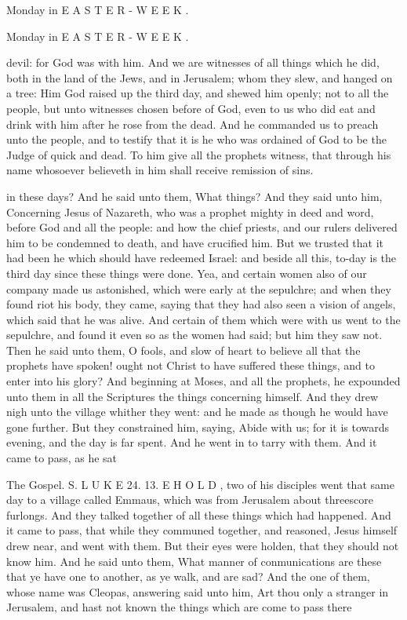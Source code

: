 Monday in E A S T E R - W E E K .

Monday in E A S T E R - W E E K .

devil: for God was with him. And we are witnesses of all things which he did, both in the land of the Jews, and in Jerusalem; whom they slew, and hanged on a tree: Him God raised up the third day, and shewed him openly; not to all the people, but unto witnesses chosen before of God, even to us who did eat and drink with him after he rose from the dead. And he commanded us to preach unto the people, and to testify that it is he who was ordained of God to be the Judge of quick and dead. To him give all the prophets witness, that through his name whosoever believeth in him shall receive remission of sins.

in these days? And he said unto them, What things? And they said unto him, Concerning Jesus of Nazareth, who was a prophet mighty in deed and word, before God and all the people: and how the chief priests, and our rulers delivered him to be condemned to death, and have crucified him. But we trusted that it had been he which should have redeemed Israel: and beside all this, to-day is the third day since these things were done. Yea, and certain women also of our company made us astonished, which were early at the sepulchre; and when they found riot his body, they came, saying that they had also seen a vision of angels, which said that he was alive. And certain of them which were with us went to the sepulchre, and found it even so as the women had said; but him they saw not. Then he said unto them, O fools, and slow of heart to believe all that the prophets have spoken! ought not Christ to have suffered these things, and to enter into his glory? And beginning at Moses, and all the prophets, he expounded unto them in all the Scriptures the things concerning himself. And they drew nigh unto the village whither they went: and he made as though he would have gone further. But they constrained him, saying, Abide with us; for it is towards evening, and the day is far spent. And he went in to tarry with them. And it came to pass, as he sat

The Gospel. S. L U K E 24. 13. E H O L D , two of his disciples went that same day to a village called Emmaus, which was from Jerusalem about threescore furlongs. And they talked together of all these things which had happened. And it came to pass, that while they communed together, and reasoned, Jesus himself drew near, and went with them. But their eyes were holden, that they should not know him. And he said unto them, What manner of conmunications are these that ye have one to another, as ye walk, and are sad? And the one of them, whose name was Cleopas, answering said unto him, Art thou only a stranger in Jerusalem, and hast not known the things which are come to pass there

